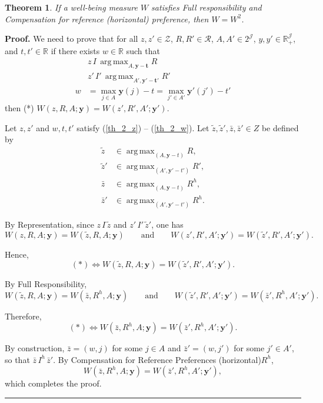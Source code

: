 \documentclass[12pt,thmsb]{article}
\DeclareMathOperator*{\argmax}{arg\,max}
\newtheorem{theorem}{Theorem}
\newenvironment{proof}[1][Proof]{\noindent \textbf{#1.} }{\  \rule{0.5em}{0.5em}}
\begin{document}
\begin{theorem}
If a well-being measure $W$ satisfies Full responsibility and Compensation for reference (horizontal) preference, then $W=W^2$.
\end{theorem}

\begin{proof}
We need to prove that for all $z,z'\in \mathcal{Z}$, $R,R'\in\mathcal{R}$, $A,A'\in 2^{\mathcal{J}}$, $y,y'\in\mathbb{R}_{+}^{\mathcal{J}}$, and $t,t'\in\mathbb{R}$ if there exists $w\in\mathbb{R}$ such that
\begin{align}
& z\, I\,\argmax_{A,\mathbf{y-t}}R \label{th_2_z}\\
& z'\, I'\,\argmax_{A',\mathbf{y'-t'}}R' \label{th_2_z'}\\
w &= \max_{j\in A}\mathbf y(j)-t=\max_{j'\in A'}\mathbf y'(j')-t' \label{th_2_w}
\end{align}
then (*) $W(z,R,A;\mathbf{y})=W(z',R',A';\mathbf{y}')$.

Let $z,z'$ and $w, t, t'$ satisfy (\ref{th_2_z}) -- (\ref{th_2_w}). Let $\tilde z,\tilde z',\bar z,\bar z'\in Z$ be defined by
\begin{align*}
\tilde z &\in \argmax_{(A,\mathbf y-t)}R,\\
\tilde z' &\in \argmax_{(A',\mathbf y'-t')}R',\\
\bar z &\in \argmax_{(A,\mathbf y-t)}R^h,\\
\bar z' &\in \argmax_{(A',\mathbf y'-t')}R^h.
\end{align*}

By Representation, since $z\,I\,\tilde z$ and $z'\,I'\,\tilde z'$, one has
\begin{equation*}
W(z,R,A;\mathbf y)=W(\tilde z,R,A;\mathbf y)
\qquad\text{and}\qquad
W(z',R',A';\mathbf y')=W(\tilde z',R',A';\mathbf y').
\end{equation*}

Hence,
\begin{equation*}
(*)\Leftrightarrow W(\tilde z,R,A;\mathbf y)=W(\tilde z',R',A';\mathbf y').
\end{equation*}

By Full Responsibility,
\begin{equation*}
W(\tilde z,R,A;\mathbf y)=W(\bar z,R^h,A;\mathbf y)
\qquad\text{and}\qquad
W(\tilde z',R',A';\mathbf y')=W(\bar z',R^h,A';\mathbf y').
\end{equation*}

Therefore,
\begin{equation*}
(*)\Leftrightarrow W(\bar z,R^h,A;\mathbf y)=W(\bar z',R^h,A';\mathbf y').
\end{equation*}

By construction, $\bar z=(w,j)$ for some $j\in A$ and $\bar z'=(w,j')$ for some $j'\in A'$, so that $\bar z\,I^h\,\bar z'$. By Compensation for Reference Preferences (horizontal)$R^h$,
\begin{equation*}
W(\bar z,R^h,A;\mathbf y)=W(\bar z',R^h,A';\mathbf y'),
\end{equation*}
which completes the proof.
\end{proof}
\end{document}

